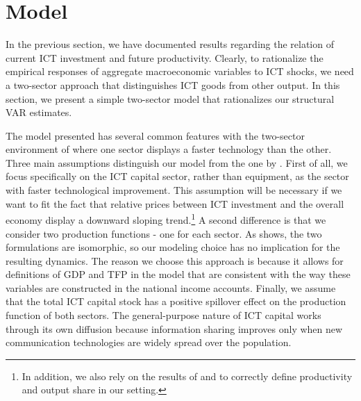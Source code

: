 \documentclass[12pt]{article}
\begin{document}


\section{Model}\label{section:theory}

In the previous section, we have documented results regarding the relation of current ICT investment and future productivity. Clearly, to rationalize the empirical responses of aggregate macroeconomic variables to ICT shocks, we need a two-sector approach that distinguishes ICT goods from other output. In this section, we present a simple two-sector model that rationalizes our structural VAR estimates. 


The model presented has several common features with the two-sector environment of \cite{greenwood1997long} where one sector displays a faster technology than the other. Three main assumptions distinguish our model from the one by \cite{greenwood1997long}. First of all, we focus specifically on the ICT capital sector, rather than equipment, as the sector with faster technological improvement. This assumption will be necessary if we want to fit the fact that relative prices between ICT investment and the overall economy display a downward sloping trend.\footnote{In addition, we also rely on the results of \cite{whelan2003two} and \cite{oulton2007investment} to correctly define productivity and output share in our setting.} A second difference is that we consider two production functions - one for each sector. As \cite{oulton2007investment} shows, the two formulations are isomorphic, so our modeling choice has no implication for the resulting dynamics. The reason we choose this approach is because it allows for definitions of GDP and TFP in the model that are consistent with the way these variables are constructed in the national income accounts. Finally, we assume that the total ICT capital stock has a positive spillover effect on the production function of both sectors. The general-purpose nature of ICT capital works through its own diffusion because information sharing improves only when new communication technologies are widely spread over the population.
\end{document}
